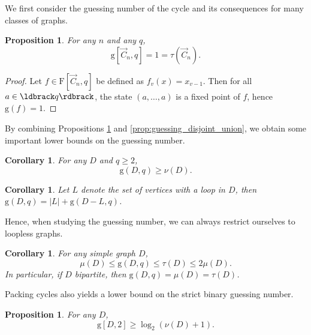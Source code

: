\documentclass[a4paper, 11pt]{book}
\numberwithin{equation}{section}
\theoremstyle{plain}
\newtheorem{corollary}	[equation]	{Corollary}
\newtheorem{proposition}[equation]	{Proposition}
\newcommand{\feedback}{\tau}
\newcommand{\packing}{\nu}
\newcommand{\matching}{\mu}
\newcommand{\functions}{\mathrm{F}}
\newcommand{\guessing}{\mathrm{g}}
\renewcommand{\(}{\ldbrack}
\renewcommand{\)}{\rdbrack}
\begin{document}
We first consider the guessing number of the cycle and its consequences for many classes of graphs.

\begin{proposition} \label{prop:cycle}
For any $n$ and any $q$, 
\[
	\guessing[\vec{C}_n, q] = 1 = \feedback(\vec{C}_n).
\]
\end{proposition}

\begin{proof}
Let $f \in \functions[\vec{C}_n, q]$ be defined as $f_v(x) = x_{v-1}$. Then for all $a \in \(q\)$, the state $(a, \dots, a)$ is a fixed point of $f$, hence $\guessing(f) = 1$.
\end{proof}

By combining Propositions \ref{prop:cycle} and \ref{prop:guessing_disjoint_union}, we obtain some important lower bounds on the guessing number.


\begin{corollary} \label{cor:g_packing}
For any $D$ and $q \ge 2$, 
\[
\guessing(D,q) \ge \packing(D).
\]
\end{corollary}

\begin{corollary} \label{cor:g_loops}
Let $L$ denote the set of vertices with a loop in $D$, then $\guessing(D,q) = |L| + \guessing(D - L, q)$.
\end{corollary}

Hence, when studying the guessing number, we can always restrict ourselves to loopless graphs.

\begin{corollary} \label{cor:g_matching}
For any simple graph $D$, 
\[
	\matching(D) \le \guessing(D,q) \le \feedback(D) \le 2\matching(D).
\]
In particular, if $D$ bipartite, then $\guessing(D,q) = \matching(D) = \feedback(D)$.
\end{corollary}


Packing cycles also yields a lower bound on the strict binary guessing number.



\begin{proposition}\label{pro:strict_packing_lower_bound}
For any $D$,
\[
	\guessing[D,2] \ge \log_2 (\nu(D) + 1).
\]
\end{proposition}
\end{document}
